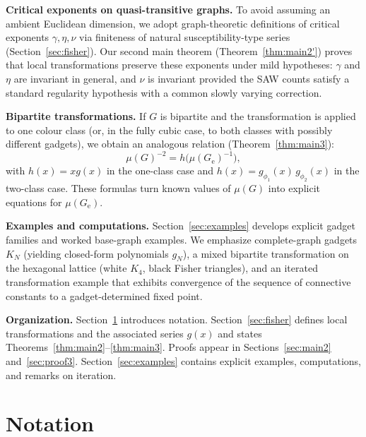 \documentclass[12pt]{amsart}
\theoremstyle{plain}
\numberwithin{equation}{section}
\numberwithin{theorem}{section}
\numberwithin{figure}{section}
\begin{document}
\medskip
\noindent\textbf{Critical exponents on quasi-transitive graphs.}
To avoid assuming an ambient Euclidean dimension, we adopt graph-theoretic definitions of
critical exponents $\gamma,\eta,\nu$ via finiteness of natural susceptibility-type series
(Section~\ref{sec:fisher}).  Our second main theorem (Theorem~\ref{thm:main2'}) proves that
local transformations preserve these exponents under mild hypotheses: $\gamma$ and $\eta$
are invariant in general, and $\nu$ is invariant provided the SAW counts satisfy a standard
regularity hypothesis with a common slowly varying correction.

\medskip
\noindent\textbf{Bipartite transformations.}
If $G$ is bipartite and the transformation is applied to one colour class (or, in the fully
cubic case, to both classes with possibly different gadgets), we obtain an analogous
relation (Theorem~\ref{thm:main3}):
\[
\mu(G)^{-2}=h\bigl(\mu(G_{\mathrm e})^{-1}\bigr),
\]
with $h(x)=xg(x)$ in the one-class case and $h(x)=g_{\phi_1}(x)\,g_{\phi_2}(x)$ in the two-class case.
These formulas turn known values of $\mu(G)$ into explicit equations for $\mu(G_{\mathrm e})$.

\medskip
\noindent\textbf{Examples and computations.}
Section~\ref{sec:examples} develops explicit gadget families and worked base-graph examples.
We emphasize complete-graph gadgets $K_N$ (yielding closed-form polynomials $g_N$), a mixed
bipartite transformation on the hexagonal lattice (white $K_4$, black Fisher triangles),
and an iterated transformation example that exhibits convergence of the sequence of
connective constants to a gadget-determined fixed point.

\medskip
\noindent\textbf{Organization.}
Section~\ref{sec:notation} introduces notation.
Section~\ref{sec:fisher} defines local transformations and the associated series $g(x)$ and
states Theorems~\ref{thm:main2}--\ref{thm:main3}.
Proofs appear in Sections~\ref{sec:main2} and~\ref{sec:proof3}.
Section~\ref{sec:examples} contains explicit examples, computations, and remarks on iteration.



















\section{Notation}\label{sec:notation}
\end{document}
